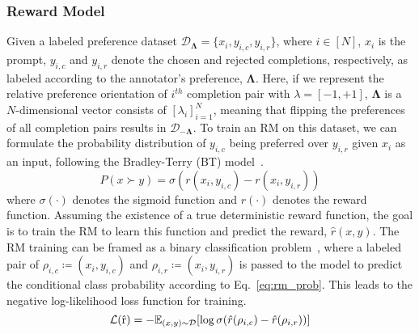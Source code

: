 \subsubsection{Reward Model}
 Given a labeled preference dataset $\mathcal{D}_{\mathbf{\Lambda}} = \{x_i, y_{i,c}, y_{i,r} \}$, where $i\in [N]$, $x_i$ is the prompt, $y_{i,c}$ and $y_{i,r}$ denote the chosen and rejected completions, respectively, as labeled according to the annotator's preference, $\mathbf{\Lambda}$. Here, if we represent the relative preference orientation of $i^{th}$ completion pair with $\lambda = [-1, +1 ]$, $\mathbf{\Lambda}$ is a $N$-dimensional vector consists of $[\lambda_i]_{i=1}^{N}$, meaning that flipping the preferences of all completion pairs results in $\mathcal{D}_{\mathbf{-\Lambda}}$. To train an RM on this dataset, we can formulate the probability distribution of $y_{i,c}$ being preferred over $y_{i,r}$ given $x_{i}$ as an input, following the Bradley-Terry (BT) model~\cite{david1963method}.
\begin{equation}
    P(x\succ y) = \sigma(r(x_i, y_{i,c}) - r(x_i, y_{i,r}))
\label{eq:rm_prob}
\end{equation}
where $\sigma(\cdot)$ denotes the sigmoid function and $r(\cdot)$ denotes the reward function. Assuming the existence of a true deterministic reward function, the goal is to train the RM to learn this function and predict the reward, $\hat{r}(x,y)$. The RM training can be framed as a binary classification problem~\cite{sun2024rethinking}, where a labeled pair of $\rho_{i,c}\coloneqq(x_i, y_{i,c})$ and  $\rho_{i,r}\coloneqq(x_i, y_{i,r})$ is passed to the model to predict the conditional class probability according to Eq.~\ref{eq:rm_prob}. This leads to the negative log-likelihood loss function for training.
\begin{equation}
    \mathcal{L(\hat{\text r})} = - \mathbb{E}_{(x,y)\sim\mathcal{D}} [\log{\sigma(\hat{r}(\rho_{i, c}) - \hat{r}(\rho_{i,r}))}] 
\end{equation}

